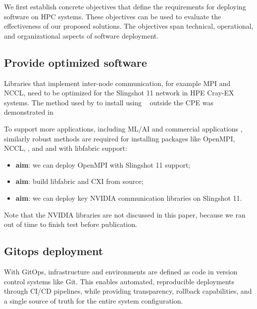 We first establish concrete objectives that define the requirements for deploying software on HPC systems.
These objectives can be used to evaluate the effectiveness of our proposed solutions.
The objectives span technical, operational, and organizational aspects of software deployment.

\subsection{Provide optimized software}

Libraries that implement inter-node communication, for example MPI and NCCL, need to be optimized for the Slingshot 11 network in HPE Cray-EX systems.
The method used by \stackinator to install \craympich using \spack~\cite{gamblin:sc15} outside the CPE was demonstrated in~\cite{uenv2023} 

To support more applications, including ML/AI and commercial applications , similarly robust methods are required for installing packages like OpenMPI, NCCL, \nvshmem, \cufftmp and \cusolvermp and with libfabric support:
\begin{itemize}
    \item \textbf{aim}: we can deploy OpenMPI with Slingshot 11 support;
    \item \textbf{aim}: build libfabric and CXI from source;
    \item \textbf{aim}: we can deploy key NVIDIA communication libraries on Slingshot 11.
\end{itemize}

Note that the NVIDIA libraries are not discussed in this paper, because we ran out of time to finish test before publication.

\subsection{Gitops deployment}

With GitOps, infrastructure and environments are defined as code in version control systems like Git.
This enables automated, reproducible deployments through CI/CD pipelines, while providing transparency, rollback capabilities, and a single source of truth for the entire system configuration.

